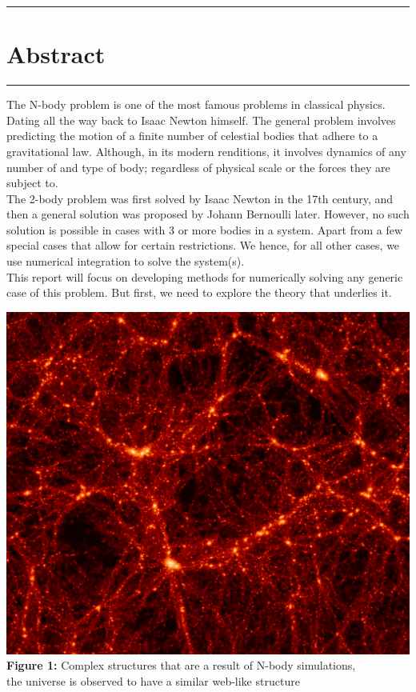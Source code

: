 \documentclass[11pt]{article}
\newcommand{\psection}[1]{{
    \begin{center}
        \noindent \rule{17cm}{0.4pt}
        \section*{\LARGE #1}
        \noindent \rule{17cm}{0.4pt}
    \end{center}
}}
\begin{document}
    \psection{Abstract}
    The N-body problem is one of the most famous problems in classical physics. Dating all the way back to Isaac Newton himself. The general problem involves predicting the motion of a finite number of celestial bodies that adhere to a gravitational law. Although, in its modern renditions, it involves dynamics of any number of and type of body; regardless of physical scale or the forces they are subject to.\\

    The 2-body problem was first solved by Isaac Newton in the 17th century, and then a general solution was proposed by Johann Bernoulli later. However, no such solution is possible in cases with 3 or more bodies in a system. Apart from a few special cases that allow for certain restrictions. We hence, for all other cases, we use numerical integration to solve the system(s).\\

    This report will focus on developing methods for numerically solving any generic case of this problem. But first, we need to explore the theory that underlies it.
    \vspace{30pt}
    \begin{center}
        \includegraphics[scale = 0.3]{images/LCDM}
        \\ \caption{\textbf{Figure 1:} Complex structures that are a result of N-body simulations, \\the universe is observed to have a similar web-like structure}
        \label{fig:fig1}
    \end{center}
    
\end{document}
